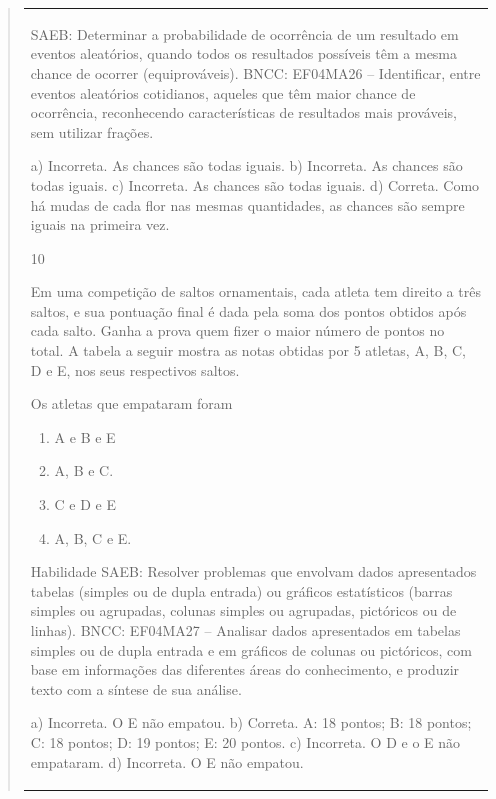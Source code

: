 \begin{mdframed}[linewidth=2pt,linecolor=salmao,roundcorner=2pt]
\begin{itemize}
{\begin{itemize}
\begin{escolha}
{\begin{quote}
{\begin{escolha}
{{{{{\begin{longtable}[]{@{}l@{}}
\begin{itemize}
{\begin{escolha}
SAEB: Determinar a probabilidade de ocorrência de um
resultado em eventos aleatórios, quando todos os resultados possíveis
têm a mesma chance de ocorrer (equiprováveis).
BNCC: EF04MA26 -- Identificar, entre eventos aleatórios cotidianos, aqueles que têm maior chance de
ocorrência, reconhecendo características de resultados mais prováveis, sem utilizar frações.

a) Incorreta. As chances são todas iguais.
b) Incorreta. As chances são todas iguais.
c) Incorreta. As chances são todas iguais.
d) Correta. Como há mudas de cada flor nas mesmas quantidades, as chances são sempre iguais na primeira vez.

\num{10}

Em uma competição de saltos ornamentais, cada atleta tem direito a três saltos,
e sua pontuação final é dada pela soma dos pontos obtidos após cada salto. Ganha a prova quem
fizer o maior número de pontos no total. A tabela a seguir mostra as notas obtidas por 5 atletas, A, B, C, D e E, nos seus respectivos saltos.




Os atletas que empataram foram

\begin{enumerate}
\item
  A e B e E
\item
  A, B e C.
\item
  C e D e E
\item
  A, B, C e E.
\end{enumerate}

Habilidade SAEB: Resolver problemas que envolvam dados apresentados tabelas (simples ou
de dupla entrada) ou gráficos estatísticos (barras simples ou agrupadas,
colunas simples ou agrupadas, pictóricos ou de linhas).
BNCC: EF04MA27 -- Analisar dados apresentados em tabelas simples ou de dupla entrada e em gráficos de
colunas ou pictóricos, com base em informações das diferentes áreas do conhecimento, e produzir
texto com a síntese de sua análise.

a) Incorreta. O E não empatou.
b) Correta. A: 18 pontos; B: 18 pontos; C: 18 pontos; D: 19 pontos; E: 20 pontos.
c) Incorreta. O D e o E não empataram.
d) Incorreta. O E não empatou.


\end{escolha}}
\end{itemize}
\end{longtable}}}}}}
\end{escolha}}
\end{quote}}
\end{escolha}
\end{itemize}}
\end{itemize}
\end{mdframed}
